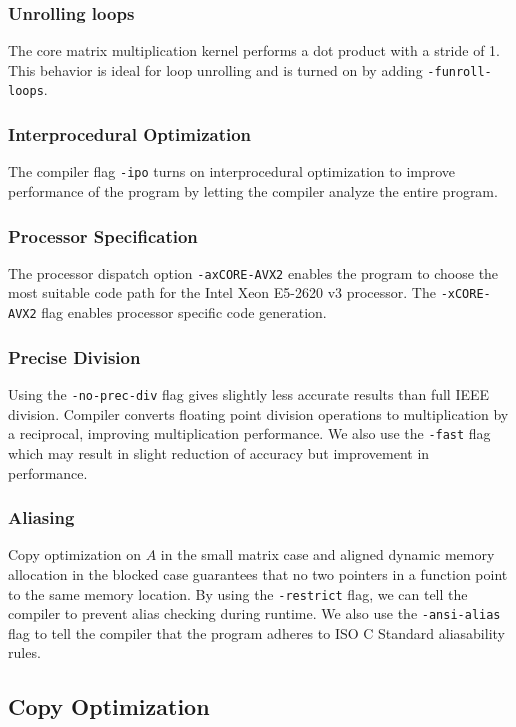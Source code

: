 \documentclass[11pt]{article}
\begin{document}
\subsubsection{Unrolling loops}
The core matrix multiplication kernel performs a dot product with a stride of 1. This behavior is ideal for loop unrolling and is turned on by adding \texttt{-funroll-loops}. 

\subsubsection{Interprocedural Optimization}
The compiler flag \texttt{-ipo} turns on interprocedural optimization to improve performance of the program by letting the compiler analyze the entire program. \cite{ipo}

\subsubsection{Processor Specification}
The processor dispatch option \texttt{-axCORE-AVX2} enables the program to choose the most suitable code path for the Intel Xeon E5-2620 v3 processor. The \texttt{-xCORE-AVX2} flag enables processor specific code generation. \cite{comp_opt}


\subsubsection{Precise Division}
Using the \texttt{-no-prec-div} flag gives slightly less accurate results than full IEEE division. Compiler converts floating point division operations to multiplication by a reciprocal, improving multiplication performance. We also use the \texttt{-fast} flag which may result in slight reduction of accuracy but improvement in performance. 

\subsubsection{Aliasing}

Copy optimization on $A$ in the small matrix case and aligned dynamic memory allocation in the blocked case guarantees that no two pointers in a function point to the same memory location. By using the \texttt{-restrict} flag, we can tell the compiler to prevent alias checking during runtime. \cite{opt} We also use the \texttt{-ansi-alias} flag to tell the compiler that the program adheres to ISO C Standard aliasability rules.


\subsection{Copy Optimization}\label{sec:copy_opt}
\end{document}
